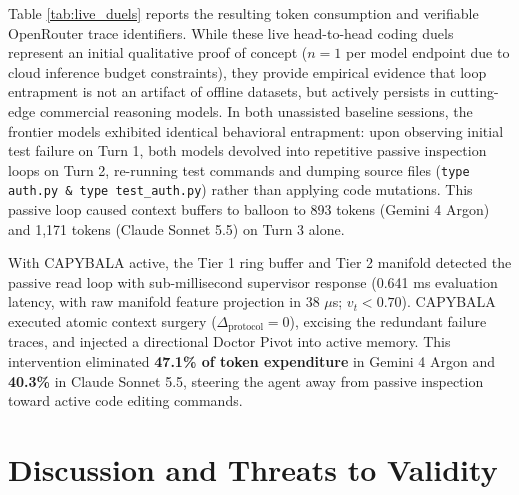 \documentclass[journal]{IEEEtran}
\begin{document}
Table \ref{tab:live_duels} reports the resulting token consumption and verifiable OpenRouter trace identifiers. While these live head-to-head coding duels represent an initial qualitative proof of concept ($n=1$ per model endpoint due to cloud inference budget constraints), they provide empirical evidence that loop entrapment is not an artifact of offline datasets, but actively persists in cutting-edge commercial reasoning models. In both unassisted baseline sessions, the frontier models exhibited identical behavioral entrapment: upon observing initial test failure on Turn 1, both models devolved into repetitive passive inspection loops on Turn 2, re-running test commands and dumping source files (\texttt{type auth.py \& type test\_auth.py}) rather than applying code mutations. This passive loop caused context buffers to balloon to 893 tokens (Gemini 4 Argon) and 1,171 tokens (Claude Sonnet 5.5) on Turn 3 alone.

With CAPYBALA active, the Tier 1 ring buffer and Tier 2 manifold detected the passive read loop with sub-millisecond supervisor response (0.641 ms evaluation latency, with raw manifold feature projection in 38 $\mu$s; $v_t < 0.70$). CAPYBALA executed atomic context surgery ($\Delta_{\text{protocol}} = 0$), excising the redundant failure traces, and injected a directional Doctor Pivot into active memory. This intervention eliminated \textbf{47.1\% of token expenditure} in Gemini 4 Argon and \textbf{40.3\%} in Claude Sonnet 5.5, steering the agent away from passive inspection toward active code editing commands.

\section{Discussion and Threats to Validity}
\end{document}
